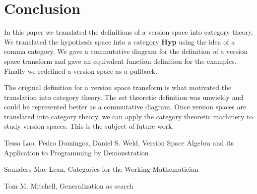 \documentclass{article}
\theoremstyle{definition}
\begin{document}
\section{Conclusion}
In this paper we translated the definitions of a version space into category theory. We translated the hypothesis space into a category \textbf{Hyp} using the idea of a comma category. We gave a commutative diagram for the definition of a version space transform and gave an equivalent function definition for the examples. Finally we redefined a version space as a pullback.  

The original definition for a version space transform is what motivated the translation into category theory. The set theoretic definition was unwieldy and could be represented better as a commutative diagram. Once version spaces are translated into category theory, we can apply the category theoretic machinery to study version spaces. This is the subject of future work.  


\begin{thebibliography}{9}
Tessa Lao, Pedro Domingos, Daniel S. Weld, Version Space Algebra and its Application to Programming by Demonstration

Saunders Mac Lean, Categories for the Working Mathematician

Tom M. Mitchell, Generalization as search
\end{thebibliography}
\end{document}

